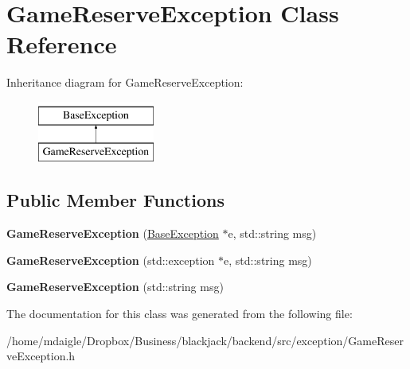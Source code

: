 \hypertarget{classGameReserveException}{
\section{\-Game\-Reserve\-Exception \-Class \-Reference}
\label{d8/d5e/classGameReserveException}
}
\-Inheritance diagram for \-Game\-Reserve\-Exception\-:\begin{figure}[H]
\begin{center}
\leavevmode
\includegraphics[height=2.000000cm]{d8/d5e/classGameReserveException}
\end{center}
\end{figure}
\subsection*{\-Public \-Member \-Functions}
\begin{DoxyCompactItemize}
\item 
\hypertarget{classGameReserveException_ab63f05de062eb7916e413135018f21bf}{
{\bfseries \-Game\-Reserve\-Exception} (\hyperlink{classBaseException}{\-Base\-Exception} $\ast$e, std\-::string msg)}
\label{d8/d5e/classGameReserveException_ab63f05de062eb7916e413135018f21bf}

\item 
\hypertarget{classGameReserveException_ad11f004241da27fca77064a4795d455a}{
{\bfseries \-Game\-Reserve\-Exception} (std\-::exception $\ast$e, std\-::string msg)}
\label{d8/d5e/classGameReserveException_ad11f004241da27fca77064a4795d455a}

\item 
\hypertarget{classGameReserveException_a9bbd0c8636bbaf9a318b6797da36f298}{
{\bfseries \-Game\-Reserve\-Exception} (std\-::string msg)}
\label{d8/d5e/classGameReserveException_a9bbd0c8636bbaf9a318b6797da36f298}

\end{DoxyCompactItemize}


\-The documentation for this class was generated from the following file\-:\begin{DoxyCompactItemize}
\item 
/home/mdaigle/\-Dropbox/\-Business/blackjack/backend/src/exception/\-Game\-Reserve\-Exception.\-h\end{DoxyCompactItemize}
